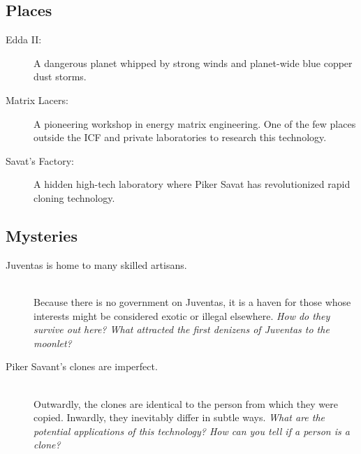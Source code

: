 \documentclass[11pt, a5paper, parskip=half-, DIV=12]{scrartcl}
\begin{document}
\subsection*{Places}
\begin{description}
	\item[Edda II:] A dangerous planet whipped by strong winds and planet-wide blue copper dust storms.
	\item[Matrix Lacers:] A pioneering workshop in energy matrix engineering. One of the few places outside the ICF and private laboratories to research this technology.
	\item[Savat's Factory:] A hidden high-tech laboratory where Piker Savat has revolutionized rapid cloning technology.
\end{description}

\subsection*{Mysteries}
\begin{description}
	\item[Juventas is home to many skilled artisans.] \phantom{} \\ Because there is no government on Juventas, it is a haven for those whose interests might be considered exotic or illegal elsewhere.  \textit{ How do they survive out here? What attracted the first denizens of Juventas to the moonlet?}
	\item[Piker Savant's clones are imperfect.] \phantom{} \\ Outwardly, the clones are identical to the person from which they were copied. Inwardly, they inevitably differ in subtle ways. \textit{What are the potential applications of this technology? How can you tell if a person is a clone? }
\end{description}

\newpage



\newpage

\thispagestyle{empty}
\end{document}
